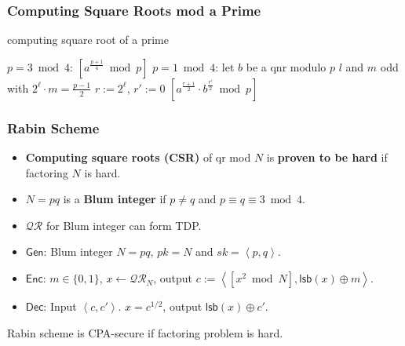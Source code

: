 \begin{frame}\frametitle{Computing Square Roots mod a Prime}
\begin{algorithm}[H]
\DontPrintSemicolon
\caption{computing square root of a prime}
\BlankLine

\KwCA $p=3 \bmod 4$:
\Return $[a^{\frac{p+1}{4}} \bmod p]$\;
\KwCA $p=1 \bmod 4$:
let $b$ be a qnr modulo $p$\;
\KwC $l$ and $m$ odd with $2^\ell\cdot m = \frac{p-1}{2}$\;
$r := 2^\ell$, $r' := 0$\;
\Return $\left[ a^{\frac{r+1}{2}}\cdot b^{\frac{r'}{2}} \bmod p\right]$\;
\end{algorithm}
\end{frame}
\begin{frame}\frametitle{Rabin Scheme}
\begin{itemize}
\item \textbf{Computing square roots (CSR)} of qr mod $N$ is \textbf{proven to be hard} if factoring $N$ is hard.
\item $N=pq$ is a \textbf{Blum integer} if $p \ne q$ and $p \equiv q \equiv 3 \bmod 4$.
\item $\mathcal{QR}$ for Blum integer can form TDP.
\end{itemize}
\begin{construction}
\begin{itemize}
\item $\mathsf{Gen}$: Blum integer $N=pq$, $pk = N$ and $sk=\left<p,q\right>$.
\item $\mathsf{Enc}$: $m\in \{0,1\}$, $x\gets \mathcal{QR}_N$, output $c := \left< [x^2 \bmod N],\mathsf{lsb}(x)\oplus m\right>$.
\item $\mathsf{Dec}$: Input $\left<c,c'\right>$. $x=c^{1/2}$, output $\mathsf{lsb}(x)\oplus c'$.
\end{itemize}
\end{construction}
Rabin scheme is CPA-secure if factoring problem is hard.
\end{frame}
